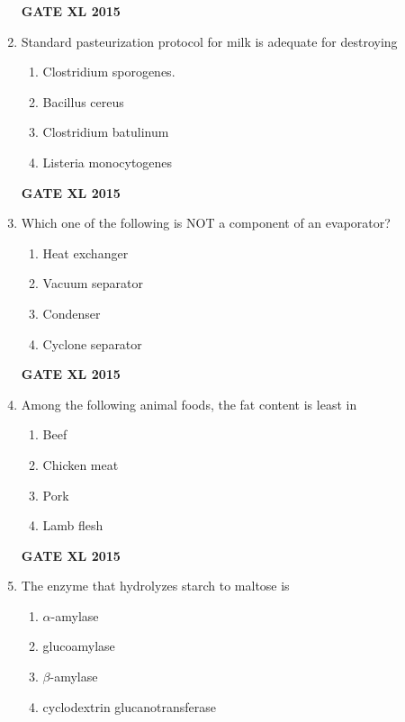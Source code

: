 \documentclass[journal,12pt,onecolumn]{IEEEtran}
\begin{document}
\begin{enumerate}
\begin{enumerate}
    \end{enumerate}
\begin{flushright}\textbf{GATE XL 2015}\end{flushright}
\item Standard pasteurization protocol for milk is adequate for destroying
    \begin{enumerate}
            \item Clostridium sporogenes.
	    \item Bacillus cereus
	    \item Clostridium batulinum
            \item Listeria monocytogenes
    \end{enumerate}
\begin{flushright}\textbf{GATE XL 2015}\end{flushright}
\item Which one of the following is NOT a component of an evaporator?
    \begin{enumerate}
            \item Heat exchanger
	    \item  Vacuum separator
	    \item Condenser
            \item Cyclone separator
    \end{enumerate}
\begin{flushright}\textbf{GATE XL 2015}\end{flushright}
\item Among the following animal foods, the fat content is least in
    \begin{enumerate}
            \item Beef
	    \item Chicken meat
	    \item Pork
            \item Lamb flesh
    \end{enumerate}
\begin{flushright}\textbf{GATE XL 2015}\end{flushright}
\item The enzyme that hydrolyzes starch to maltose is
    \begin{enumerate}
            \item $\alpha$-amylase
	    \item glucoamylase
	    \item $\beta$-amylase
            \item cyclodextrin glucanotransferase
    \end{enumerate}

\end{enumerate}
\end{document}
